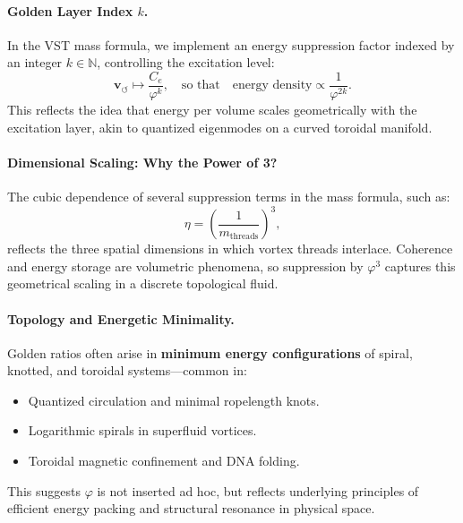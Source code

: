 \documentclass[11pt]{article}
\begin{document}
    \paragraph{Golden Layer Index \( k \).}
    In the VST mass formula, we implement an energy suppression factor indexed by an integer \( k \in \mathbb{N} \), controlling the excitation level:
    \begin{equation}
        \mathbf{v}_{\scriptscriptstyle\boldsymbol{\circlearrowleft}} \longmapsto \frac{C_e}{\varphi^k}, \quad \text{so that} \quad \text{energy density} \propto \frac{1}{\varphi^{2k}}.
    \end{equation}
    This reflects the idea that energy per volume scales geometrically with the excitation layer, akin to quantized eigenmodes on a curved toroidal manifold.

    \paragraph{Dimensional Scaling: Why the Power of 3?}
    The cubic dependence of several suppression terms in the mass formula, such as:
    \begin{equation}
        \eta = \left( \frac{1}{m_{\text{threads}}} \right)^3,
    \end{equation}
    reflects the three spatial dimensions in which vortex threads interlace. Coherence and energy storage are volumetric phenomena, so suppression by \( \varphi^3 \) captures this geometrical scaling in a discrete topological fluid.

    \paragraph{Topology and Energetic Minimality.}
    Golden ratios often arise in \textbf{minimum energy configurations} of spiral, knotted, and toroidal systems—common in:
    \begin{itemize}
        \item Quantized circulation and minimal ropelength knots.
        \item Logarithmic spirals in superfluid vortices.
        \item Toroidal magnetic confinement and DNA folding.
    \end{itemize}
    This suggests \( \varphi \) is not inserted ad hoc, but reflects underlying principles of efficient energy packing and structural resonance in physical space.
\end{document}
